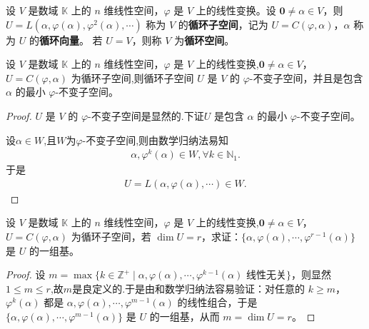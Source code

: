 \documentclass[../../main.tex]{subfiles}
\begin{document}
\begin{definition}[循环子空间]\label{definition:循环子空间和循环空间}
设 \(V\) 是数域 \(\mathbb{K}\) 上的 \(n\) 维线性空间，\(\varphi\) 是 \(V\) 上的线性变换。设 \(\mathbf{0}\neq\alpha\in V\)，则 \(U = L(\alpha,\varphi(\alpha),\varphi^2(\alpha),\cdots)\) 称为 \(V\) 的\textbf{循环子空间}，记为 \(U = C(\varphi,\alpha)\)，\(\alpha\) 称为 \(U\) 的\textbf{循环向量}。
若 \(U = V\)，则称 \(V\) 为\textbf{循环空间}。 
\end{definition}

\begin{theorem}[循环子空间的基本性质]\label{theorem:循环子空间的基本性质}
设 \(V\) 是数域 \(\mathbb{K}\) 上的 \(n\) 维线性空间，\(\varphi\) 是 \(V\) 上的线性变换,\(\mathbf{0}\neq\alpha\in V\)， \(U = C(\varphi,\alpha)\) 为循环子空间,则循环子空间 \(U\) 是 \(V\) 的 \(\varphi\)-不变子空间，并且是包含 \(\alpha\) 的最小 \(\varphi\)-不变子空间。
\end{theorem}
\begin{proof}
\(U\) 是 \(V\) 的 \(\varphi\)-不变子空间是显然的.下证\(U\) 是包含 \(\alpha\) 的最小 \(\varphi\)-不变子空间。

设$\alpha \in W$,且$W$为$\varphi$-不变子空间,则由数学归纳法易知
\begin{align*}
\alpha,\varphi^k(\alpha)\in W,\forall k\in \mathbb{N}_1.
\end{align*}
于是
\begin{align*}
U=L(\alpha,\varphi(\alpha),\cdots)\in W.
\end{align*}
\end{proof}

\begin{theorem}\label{theorem:循环子空间的基}
设 \(V\) 是数域 \(\mathbb{K}\) 上的 \(n\) 维线性空间，\(\varphi\) 是 \(V\) 上的线性变换,\(\mathbf{0}\neq\alpha\in V\)， \(U = C(\varphi,\alpha)\) 为循环子空间，若 \(\dim U = r\)，求证：\(\{\alpha,\varphi(\alpha),\cdots,\varphi^{r - 1}(\alpha)\}\) 是 \(U\) 的一组基。
\end{theorem}
\begin{proof}
设 \(m = \max\{k\in\mathbb{Z}^+\mid\alpha,\varphi(\alpha),\cdots,\varphi^{k - 1}(\alpha)\text{ 线性无关}\}\)，则显然$1\leq m\leq r$,故$m$是良定义的.于是由和数学归纳法容易验证：对任意的 \(k\geq m\)，\(\varphi^k(\alpha)\) 都是 \(\alpha,\varphi(\alpha),\cdots,\varphi^{m - 1}(\alpha)\) 的线性组合，于是 \(\{\alpha,\varphi(\alpha),\cdots,\varphi^{m - 1}(\alpha)\}\) 是 \(U\) 的一组基，从而 \(m = \dim U = r\)。 
\end{proof}
\end{document}
